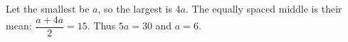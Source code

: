 Let the smallest be $a$, so the largest is $4a$. The equally spaced middle is their mean: $\dfrac{a+4a}{2}=15$. Thus $5a=30$ and $\boxed{a=6}$.
